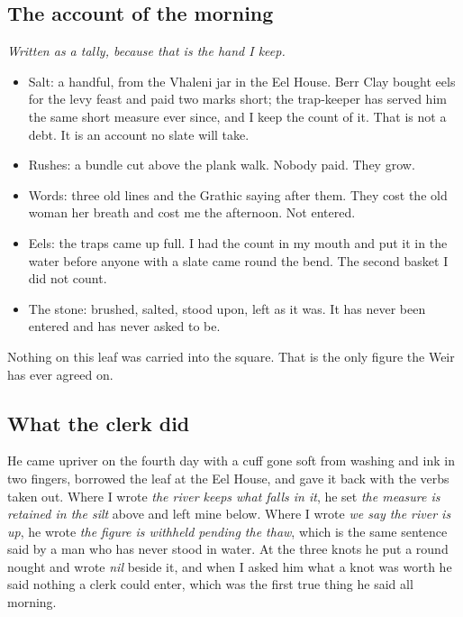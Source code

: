 \documentclass{design/chronicle}
\begin{document}
\subsection*{The account of the morning}

\emph{Written as a tally, because that is the hand I keep.}

\begin{itemize}[leftmargin=1.4em,itemsep=1pt,topsep=3pt,parsep=0pt]

\item Salt: a handful, from the Vhaleni jar in the Eel House. Berr Clay bought eels for the levy feast and paid two marks short; the trap-keeper has served him the same short measure ever since, and I keep the count of it. That is not a debt. It is an account no slate will take.

\item Rushes: a bundle cut above the plank walk. Nobody paid. They grow.

\item Words: three old lines and the Grathic saying after them. They cost the old woman her breath and cost me the afternoon. Not entered.

\item Eels: the traps came up full. I had the count in my mouth and put it in the water before anyone with a slate came round the bend. The second basket I did not count.

\item The stone: brushed, salted, stood upon, left as it was. It has never been entered and has never asked to be.

\end{itemize}

Nothing on this leaf was carried into the square. That is the only figure the Weir has ever agreed on.

\subsection*{What the clerk did}

He came upriver on the fourth day with a cuff gone soft from washing and ink in two fingers, borrowed the leaf at the Eel House, and gave it back with the verbs taken out. Where I wrote \emph{the river keeps what falls in it}, he set \emph{the measure is retained in the silt} above and left mine below. Where I wrote \emph{we say the river is up}, he wrote \emph{the figure is withheld pending the thaw}, which is the same sentence said by a man who has never stood in water. At the three knots he put a round nought and wrote \emph{nil} beside it, and when I asked him what a knot was worth he said nothing a clerk could enter, which was the first true thing he said all morning.
\end{document}
